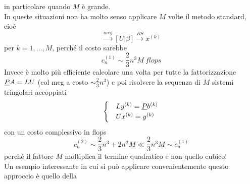 \documentclass[12pt,a4paper]{article}
\begin{document}
in particolare quando $M$ è grande.\\
In queste situazioni non ha molto senso applicare $M$ volte il metodo standard, cioè
\begin{equation*}
    [A|b] \overset{meg}{\longrightarrow} [U|\beta] \overset{BS}{\longrightarrow} x^{(k)}
\end{equation*}
per $k=1,...,M$, perché il costo sarebbe
\begin{equation*}
    c_n^{(1)} \sim \frac{2}{3}n^3M \ flops
\end{equation*}
Invece è molto più efficiente calcolare una volta per tutte la fattorizzazione $\uline{P}A=LU$ (col meg a costo $\sim \frac{2}{3}n^3$) e poi risolvere la sequenza di $M$ sistemi tringolari accoppiati
\begin{equation*}
    \begin{cases}
        & Ly^{(k)} = \uline{P}b^{(k)} \\
        & Ux^{(k)} = y^{(k)}
    \end{cases}
\end{equation*}
con un costo complessivo in flops
\begin{equation*}
    c_n^{(2)} \sim \frac{2}{3}n^3 + 2n^2M \ll \frac{2}{3}n^3M \sim c_n^{(1)}
\end{equation*}
perché il fattore $M$ moltiplica il termine quadratico e non quello cubico!\\
Un esempio interessante in cui si può applicare convenientemente questo approccio è quello della
\end{document}
